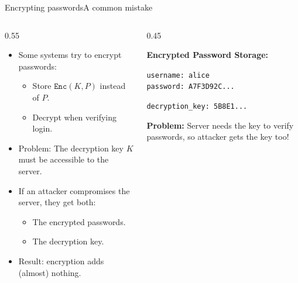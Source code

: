 \ifdefined\PRESENTATION\else\PassOptionsToClass{handout}{beamer}\fi\documentclass[aspectratio=169, lualatex]{beamer}
\begin{document}
\begin{frame}{Encrypting passwords}{A common mistake}
	\begin{columns}[c]
		\begin{column}{0.55\textwidth}
			\begin{itemize}
				\item Some systems try to encrypt passwords:
				      \begin{itemize}
					      \item Store $\texttt{Enc}(K, P)$ instead of $P$.
					      \item Decrypt when verifying login.
				      \end{itemize}
				\item Problem: The decryption key $K$ must be accessible to the server.
				\item If an attacker compromises the server, they get both:
				      \begin{itemize}
					      \item The encrypted passwords.
					      \item The decryption key.
				      \end{itemize}
				\item Result: encryption adds (almost) nothing.
			\end{itemize}
		\end{column}
		\begin{column}{0.45\textwidth}
			\begin{tcolorbox}[colback=black!5!white,colframe=ciphergray]
				\textbf{Encrypted Password Storage:}

				\vspace{0.2cm}

				\texttt{username: alice}\\
				\texttt{password: A7F3D92C...}

				\vspace{0.2cm}

				\texttt{decryption\_key: 5B8E1...}

				\vspace{0.3cm}

				\textcolor{cipherprimary}{\textbf{Problem:} \small Server needs the key to verify passwords, so attacker gets the key too!}
			\end{tcolorbox}
		\end{column}
	\end{columns}
\end{frame}
\end{document}
